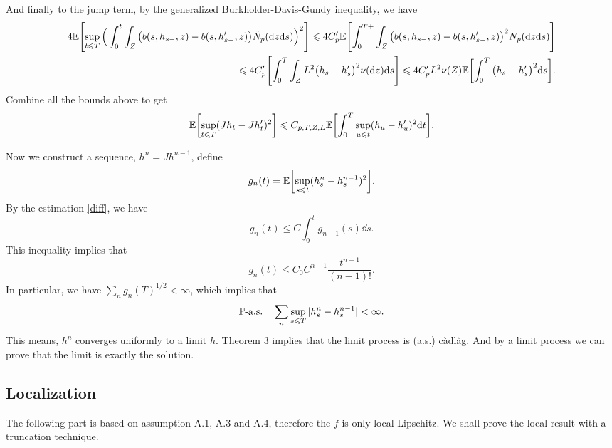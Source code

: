\documentclass[8pt,onesided]{article}
\begin{document}
And finally to the jump term, by the \hyperref[bdgg]{generalized Burkholder-Davis-Gundy inequality}, we have
\begin{align*}
    4\mathbb{E}\Biggl[ \sup_{t\leqslant T}\Big(\int_0^t \int_Z \big(b(s, h_{s-},z)-b(s, h'_{s-},z)\big)\tilde N_p(\dd z \dd s)\Big)^2 \Biggr]
    \leqslant
    4C'_p \mathbb{E}\Biggl[ \int_0^{T+}\int_Z \big(b(s, h_{s-},z)-b(s, h'_{s-},z) \big)^2N_p(\dd z\dd s)\Biggr]\\
    \leqslant
     4C'_p\Biggl[ \int_0^T \int_ZL^2\big(h_s-h'_s\big)^2 \nu(\dd z)\dd s\Biggr]
     \leqslant
     4C'_p L^2\nu(Z)\mathbb{E}\biggl[\int_0^T\big(h_s-h'_s\big)^2\dd s \biggr].
\end{align*}
Combine all the bounds above to get
\begin{equation}
    \label{diff}
\mathbb{E}\biggl[ \sup_{t\leqslant T} (Jh_t-Jh'_t)^2\biggr]\leqslant C_{p,T,Z,L}\mathbb{E}\biggl[\int_0^T \sup_{u\leqslant t}(h_u-h'_u)^2 \dd t\biggr].
\end{equation}

Now we construct a sequence, $h^n=Jh^{n-1}$, define
\begin{equation*}
    g_n(t)=\mathbb{E}\biggl[\sup_{s\leqslant t}(h^n_s-h^{n-1}_s)^2\biggr].
\end{equation*}
By the estimation \ref{diff}, we have
\begin{equation*}
    g_n(t)\le C\int_0^t g_{n-1}(s)\dd s.
\end{equation*}
This inequality implies that
\begin{equation*}
    g_n(t)\le C_0 C^{n-1} \frac{t^{n-1}}{(n-1)!}.
\end{equation*}
In particular, we have $\sum_n g_n(T)^{1/2}<\infty$, which implies that
\begin{equation*}
    \mathbb{P}\text{-a.s.}\quad \sum_{n} \sup_{s\leqslant T}|h_s^n-h_s^{n-1}| <\infty.
\end{equation*}
This means, $h^n$ converges uniformly to a limit $h$. \hyperref[ucd]{Theorem 3} implies that the limit process is (a.s.) càdlàg. And by a limit process we can prove that the limit is exactly the solution.

\subsection{Localization}

The following part is based on assumption A.1, A.3 and A.4, therefore the $f$ is only local Lipschitz. We shall prove the local result with a truncation technique.
\end{document}
